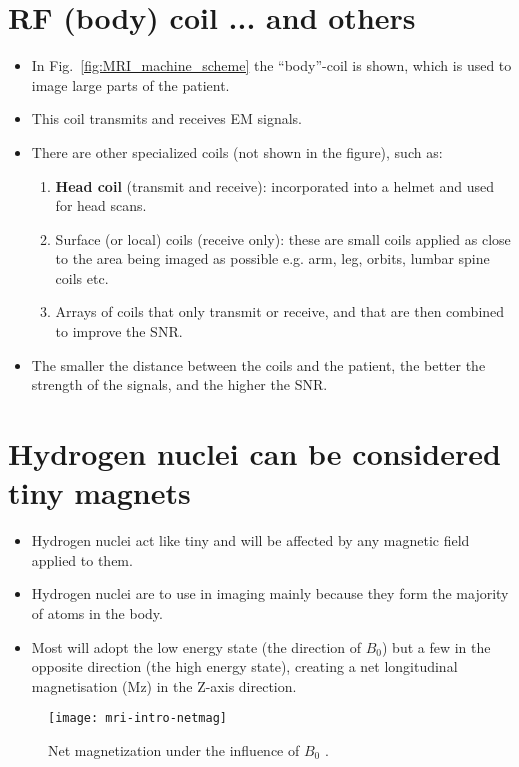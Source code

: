 \section{\gls{RF} (body) coil ... and others}
\begin{itemize}
\item In Fig.~\ref{fig:MRI_machine_scheme} the ``body''-coil is shown,
  which is used to image large parts of the patient.
\item This coil transmits and receives \gls{EM} signals.
\item There are other specialized coils (not shown in the figure),
  such as:
  \begin{enumerate}
  \item \textbf{Head coil} (transmit and receive): incorporated into a
    helmet and used for head scans.
  \item Surface (or local) coils (receive only): these are small coils
    applied as close to the area being imaged as possible e.g. arm,
    leg, orbits, lumbar spine coils etc.
  \item Arrays of coils that only transmit or receive, and that are
    then combined to improve the SNR.
  \end{enumerate}
\item The smaller the distance between the coils and the patient, the
  better the strength of the signals, and the higher the \gls{SNR}.
\end{itemize}

\section{Hydrogen nuclei can be considered tiny magnets}
\begin{itemize}
\item Hydrogen nuclei act like tiny  and will be affected by any magnetic field
  applied to them.
\item Hydrogen nuclei are  to use in imaging mainly because they form the
  majority of atoms in the body.
\item Most will adopt the low energy state (the direction of $B_0$)
  but a few in the opposite direction (the high energy state),
  creating a net longitudinal magnetisation (Mz) in the Z-axis
  direction.
\end{itemize}
\vspace{-4ex}
\begin{figure}[!b]
  \centering
  \texttt{[image: mri-intro-netmag]}
  \caption{Net magnetization under the influence of $B_0$ \cite{abdulla2025MRI_intro}.}
  \label{fig:MRI-intro-netmag}
\end{figure}

